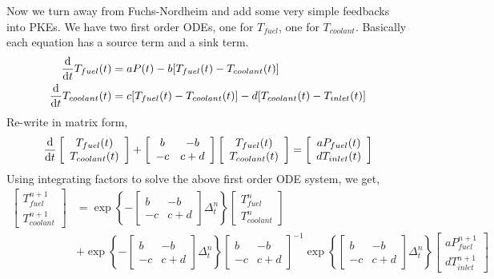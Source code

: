 \documentclass{school-22.211-notes}
\begin{document}
\clearpage
{}
Now we turn away from Fuchs-Nordheim and add some very simple feedbacks into PKEs. We have two first order ODEs, one for $T_{fuel}$, one for $T_{coolant}$. Basically each equation has a source term and a sink term. 
\begin{align}
\frac{\mathrm{d}}{\mathrm{d}t} T_{fuel} (t) &= a P(t) - b [T_{fuel}(t) - T_{coolant}(t)] \\
\frac{\mathrm{d}}{\mathrm{d}t} T_{coolant} (t) &= c [T_{fuel}(t) - T_{coolant} (t) ] - d [T_{coolant} (t) - T_{inlet} (t) ] 
\end{align}
Re-write in matrix form, 
\begin{align}
\frac{\mathrm{d}}{\mathrm{d}t} \left[ \begin{array}{c} T_{fuel}(t) \\ T_{coolant} (t) \end{array} \right]
+ \left[ \begin{array}{cc} b & -b \\ -c & c+d \end{array} \right] 
\left[ \begin{array}{c} T_{fuel} (t) \\ T_{coolant} (t) \end{array} \right] 
= 
\left[ \begin{array}{c} a P_{fuel}(t) \\ d T_{inlet}(t) \end{array} \right]
\end{align}
Using integrating factors to solve the above first order ODE system,  we get, 
\begin{align}
 \left[ \begin{array}{c} T_{fuel}^{n+1} \\ T_{coolant}^{n+1} \end{array} \right]
&= \exp \left\{ -  \left[ \begin{array}{cc} b & -b \\ -c & c+d \end{array} \right] \Delta_t^n \right\}
\left[ \begin{array}{c} T_{fuel}^n \\ T_{coolant}^n \end{array} \right] \\
&+ \exp \left\{ -  \left[ \begin{array}{cc} b & -b \\ -c & c+d \end{array} \right] \Delta_t^n \right\}
\left[ \begin{array}{cc} b & -b \\ -c & c+d \end{array} \right]^{-1}
\exp \left\{ \left[ \begin{array}{cc} b & -b \\ -c & c+d \end{array} \right] \Delta_t^n \right\}
\left[ \begin{array}{c} a P_{fuel}^{n+1} \\ d T_{inlet}^{n+1} \end{array} \right]
\end{align}
\end{document}

